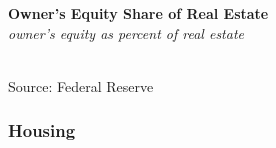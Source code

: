 \documentclass{report}
\makeatletter
\newcommand{\tbllink}[1]{\href{https://raw.githubusercontent.com/bdecon/US-chartbook/master/chartbook/data/#1}{\faTable}}
\newcommand*\short[1]{\expandafter\@gobbletwo\number\numexpr#1\relax}
\newcommand{\shdateaxisticks}{
		date coordinates in=x, axis line style={draw=none},
		xmax={2021-02-01},
		max space between ticks=40,	    
		xtick={{1990-01-01}, {1995-01-01}, {2000-01-01}, 
			{2005-01-01}, {2010-01-01}, {2015-01-01}, {2020-01-01}},
		minor xtick={},
		enlarge y limits={0.06}, enlarge x limits={0.01},
		}
\newcommand{\stdline}[4]{\addplot[very thick, no markers, color=#1] 
		table [x=#2, y=#3, col sep=comma] {#4};	}
\newcommand{\rbars}{
		\fill[color=black!10] (axis cs:{1990-07-01},\pgfkeysvalueof{/pgfplots/ymin}) rectangle 
			(axis cs:{1991-03-01}, \pgfkeysvalueof{/pgfplots/ymax});
		\fill[color=black!10] (axis cs:{2007-12-01},\pgfkeysvalueof{/pgfplots/ymin}) rectangle 
			(axis cs:{2009-07-01}, \pgfkeysvalueof{/pgfplots/ymax});
		\fill[color=black!10] (axis cs:{2001-03-01},\pgfkeysvalueof{/pgfplots/ymin}) rectangle 
			(axis cs:{2001-11-01}, \pgfkeysvalueof{/pgfplots/ymax});}
\makeatother
\begin{document}
{{{{\begin{minipage}{0.76\textwidth}
\end{minipage}

\vspace{2mm}

\begin{minipage}{0.29\textwidth}

\small 

\end{minipage}\hspace{8mm}
\begin{minipage}{0.44\textwidth}
\noindent \normalsize \textbf{Owner's Equity Share of Real Estate}\\
\footnotesize{\textit{owner's equity as percent of real estate}}\\
\noindent \hspace*{-2mm} \\
\footnotesize{Source: Federal Reserve} \hspace{30mm} \tbllink{homeeq.csv} 

\end{minipage}

\newpage


\subsubsection*{\color{black!70} \seriffont Housing}

\begin{minipage}{0.76\textwidth}

\vspace{2mm}


\end{minipage}}}}}
\end{document}
